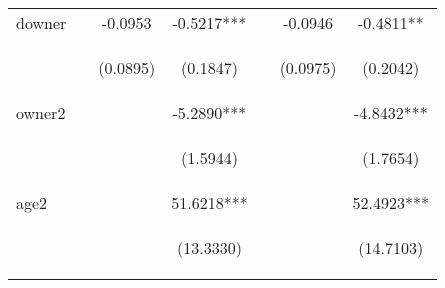 \begin{center}
\begin{tabular}{lcccccc}
downer &  & -0.0953 & -0.5217*** &  & -0.0946 & -0.4811** \\
\vspace{4pt} & \begin{footnotesize}\end{footnotesize} & \begin{footnotesize}(0.0895)\end{footnotesize} & \begin{footnotesize}(0.1847)\end{footnotesize} & \begin{footnotesize}\end{footnotesize} & \begin{footnotesize}(0.0975)\end{footnotesize} & \begin{footnotesize}(0.2042)\end{footnotesize} \\
owner2 &  &  & -5.2890*** &  &  & -4.8432*** \\
\vspace{4pt} & \begin{footnotesize}\end{footnotesize} & \begin{footnotesize}\end{footnotesize} & \begin{footnotesize}(1.5944)\end{footnotesize} & \begin{footnotesize}\end{footnotesize} & \begin{footnotesize}\end{footnotesize} & \begin{footnotesize}(1.7654)\end{footnotesize} \\
age2 &  &  & 51.6218*** &  &  & 52.4923*** \\
\vspace{4pt} & \begin{footnotesize}\end{footnotesize} & \begin{footnotesize}\end{footnotesize} & \begin{footnotesize}(13.3330)\end{footnotesize} & \begin{footnotesize}\end{footnotesize} & \begin{footnotesize}\end{footnotesize} & \begin{footnotesize}(14.7103)\end{footnotesize} \\

\end{tabular}
\end{center}
